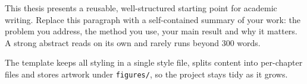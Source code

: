 This thesis presents a reusable, well-structured starting point for
academic writing. Replace this paragraph with a self-contained summary of
your work: the problem you address, the method you use, your main result
and why it matters. A strong abstract reads on its own and rarely runs
beyond 300 words.

The template keeps all styling in a single style file, splits content into
per-chapter files and stores artwork under \texttt{figures/}, so the
project stays tidy as it grows.
